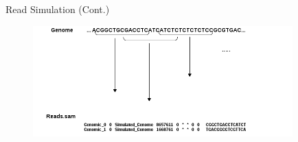 \documentclass{beamer}
\begin{document}

\begin{frame}{Read Simulation (Cont.) }
\begin{figure}[H]
\centering
\includegraphics[width=10cm]{pics/readsampling2.png}
\label{hist}
\end{figure}
\end{frame}


\end{document}
